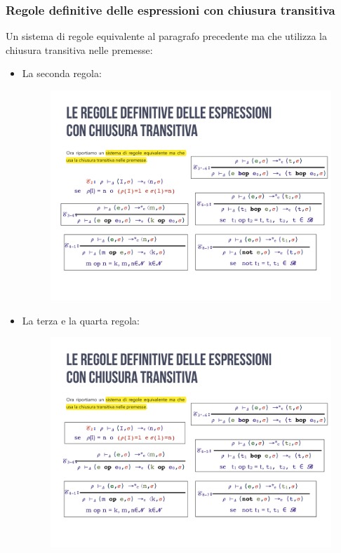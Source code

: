 \documentclass[a4paper]{article}
\begin{document}
 	\subsubsection{Regole definitive delle espressioni con chiusura transitiva}
 	
 	Un sistema di regole equivalente al paragrafo precedente ma che utilizza la chiusura transitiva nelle premesse:
 	\begin{itemize} 		
 		\item La seconda regola:
 		\begin{figure}[!htp]
 			\centering
 			\includegraphics[width=.7\textwidth]{img/regola_espressione-up-transitiva-2.pdf}
 		\end{figure}
 		
 		\item La terza e la quarta regola:
 		\begin{figure}[!htp]
 			\centering
 			\includegraphics[width=.7\textwidth]{img/regola_espressione-up-transitiva-3_4.pdf}
 		\end{figure}
 		

\end{itemize}
\end{document}
